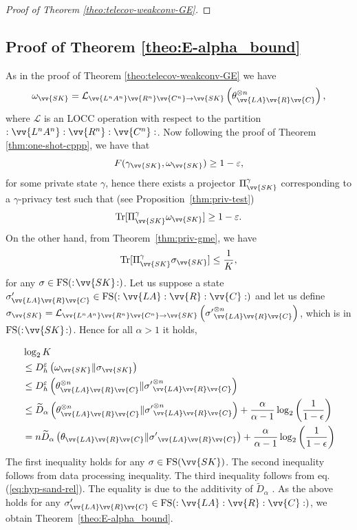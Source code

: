\documentclass[aps,pra,twocolumn,superscriptaddress,longbibliography]{revtex4-1}
\def\Tr{\operatorname{Tr}}
\def\FS{\operatorname{FS}}
\def\({\left(}
\def\){\right)}
\newcommand{\mc}[1]{\mathcal{#1}}
\begin{document}
\begin{appendix}
\begin{proof}[Proof of Theorem \ref{theo:telecov-weakconv-GE}]
\end{proof}

\subsection{Proof of Theorem \ref{theo:E-alpha_bound}}
As in the proof of Theorem \ref{theo:telecov-weakconv-GE} we have 
\begin{equation}
\omega_{\vv{SK}}=\mc{L}_{\vv{L^nA^n}\vv{R^n}\vv{C^n}\to\vv{SK}}\(\theta^{\otimes n}_{\vv{LA}\vv{R}\vv{C}}\),
\end{equation}
where $\mc{L}$ is an LOCC operation with respect to the partition $:\vv{L^nA^n}:\vv{R^n}:\vv{C^n}:$. Now following the proof of Theorem \ref{thm:one-shot-cppp}, we have that
\begin{equation}
F(\gamma_{\vv{SK}}, \omega_{\vv{SK}})\geq 1-\varepsilon,
\end{equation}
for some private state $\gamma$, hence there exists a projector $\Pi^\gamma_{\vv{SK}}$ corresponding to a $\gamma$-privacy test such that (see Proposition~\ref{thm:priv-test})
\begin{equation}
\Tr[\Pi^\gamma_{\vv{SK}}\omega_{\vv{SK}}]\geq 1-\varepsilon. 
\end{equation}
On the other hand, from Theorem~\ref{thm:priv-gme}, we have
\begin{equation}
\Tr[\Pi^\gamma_{\vv{SK}}\sigma_{\vv{SK}}]\leq \frac{1}{K},
\end{equation}
for any $\sigma\in\FS(:\!\vv{SK}\!:)$. Let us suppose a state $\sigma'_{\vv{LA}\vv{R}\vv{C}}\in\FS(:\vv{LA}:\vv{R}:\vv{C}:)$ and let us define $\sigma_{\vv{SK}}=\mc{L}_{\vv{L^nA^n}\vv{R^n}\vv{C^n}\to\vv{SK}}\({\sigma'}^{\otimes n}_{\vv{LA}\vv{R}\vv{C}}\)$, which is in $\FS(:\!\vv{SK}\!:)$. Hence for all $\alpha>1$ it holds,

\begin{align}
& \log_2 K\nonumber\\ 
&\leq D^\varepsilon_h\(\omega_{\vv{SK}}\Vert \sigma_{\vv{SK}}\)\\
&\leq D^\varepsilon_h\(\theta^{\otimes n}_{\vv{LA}\vv{R}\vv{C}}\Vert{\sigma'}^{\otimes n}_{\vv{LA}\vv{R}\vv{C}}\)\\
&\leq \widetilde{D}_\alpha\(\theta^{\otimes n}_{\vv{LA}\vv{R}\vv{C}}\Vert{\sigma'}^{\otimes n}_{\vv{LA}\vv{R}\vv{C}}\)+\frac{\alpha}{\alpha-1}\log_2\(\frac{1}{1-\epsilon}\)\\
&= n\widetilde{D}_\alpha\(\theta_{\vv{LA}\vv{R}\vv{C}}\Vert{\sigma'}_{\vv{LA}\vv{R}\vv{C}}\)+\frac{\alpha}{\alpha-1}\log_2\(\frac{1}{1-\epsilon}\)
\end{align}
The first inequality holds for any $\sigma\in\FS(\vv{SK})$. The second inequality follows from data processing inequality. The third inequality follows from eq. (\ref{eq:hyp-sand-rel}). The equality is due to the additivity of $\widetilde{D}_\alpha$ \cite{MDSFT13}. As the above holds for any $\sigma'_{\vv{LA}\vv{R}\vv{C}}\in\FS(:\vv{LA}:\vv{R}:\vv{C}:)$, we obtain Theorem~\ref{theo:E-alpha_bound}.


\end{appendix}
\end{document}
